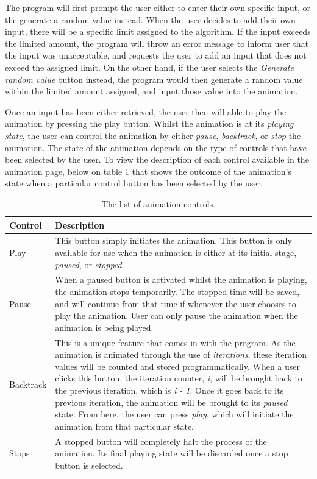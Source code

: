 The program will first prompt the user either to enter their own specific input, or the generate a random value instead. When the user decides to add their own input, there will be a specific limit assigned to the algorithm. If the input exceeds the limited amount, the program will throw an error message to inform user that the input was unacceptable, and requests the user to add an input that does not exceed the assigned limit. On the other hand, if the user selects the \textit{Generate random value} button instead, the program would then generate a random value within the limited amount assigned, and input those value into the animation.

Once an input has been either retrieved, the user then will able to play the animation by pressing the play button. Whilst the animation is at its \textit{playing state}, the user can control the animation by either \textit{pause}, \textit{backtrack}, or \textit{stop} the animation. The state of the animation depends on the type of controls that have been selected by the user. To view the description of each control available in the animation page, below on table \ref{tab:animationControls} that shows the outcome of the animation's state when a particular control button has been selected by the user.

\begin{table}[H]
\caption{The list of animation controls.}
\begin{center}
\begin{tabular}{| p{4cm} | p{11cm} |}
		\hline
		\textbf{Control} & \textbf{Description} \\ \hline
		Play & This button simply initiates the animation. This button is only available for use when the animation is either at its initial stage, \textit{paused}, or \textit{stopped}. \\ \hline
     Pause & When a paused button is activated whilst the animation is playing, the animation stops temporarily. The stopped time will be saved, and will continue from that time if whenever the user chooses to play the animation. User can only pause the animation when the animation is being played. \\ \hline
     Backtrack &  This is a unique feature that comes in with the program. As the animation is animated through the use of \textit{iterations}, these iteration values will be counted and stored programmatically. When a user clicks this button, the iteration counter, \textit{i}, will be brought back to the previous iteration, which is \textit{i - 1}. Once it goes back to its previous iteration, the animation will be brought to its \textit{paused} state. From here, the user can press \textit{play}, which will initiate the animation from that particular state. \\ \hline
     Stops &  A stopped button will completely halt the process of the animation. Its final playing state will be discarded once a stop button is selected. \\ \hline
\end{tabular}
\end{center}
\label{tab:animationControls}
\end{table}

